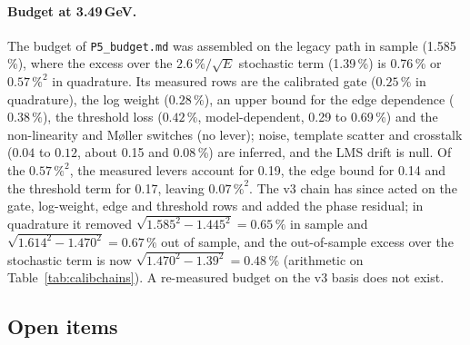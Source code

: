 \documentclass[11pt]{article}
\newcommand{\code}[1]{\texttt{#1}}
\begin{document}
\paragraph{Budget at 3.49\,GeV.} The budget of \code{P5\_budget.md} was assembled on the legacy path in sample (1.585\,\%), where the excess over the $2.6\,\%/\sqrt{E}$ stochastic term (1.39\,\%) is 0.76\,\% or $0.57\,\%^2$ in quadrature. Its measured rows are the calibrated gate ($0.25\,\%$ in quadrature), the log weight ($0.28\,\%$), an upper bound for the edge dependence ($0.38\,\%$), the threshold loss ($0.42\,\%$, model-dependent, 0.29 to 0.69\,\%) and the non-linearity and M{\o}ller switches (no lever); noise, template scatter and crosstalk ($0.04$ to $0.12$, about 0.15 and 0.08\,\%) are inferred, and the LMS drift is null. Of the $0.57\,\%^2$, the measured levers account for 0.19, the edge bound for 0.14 and the threshold term for 0.17, leaving $0.07\,\%^2$. The v3 chain has since acted on the gate, log-weight, edge and threshold rows and added the phase residual; in quadrature it removed $\sqrt{1.585^2 - 1.445^2} = 0.65\,\%$ in sample and $\sqrt{1.614^2 - 1.470^2} = 0.67\,\%$ out of sample, and the out-of-sample excess over the stochastic term is now $\sqrt{1.470^2 - 1.39^2} = 0.48\,\%$ (arithmetic on Table~\ref{tab:calibchains}). A re-measured budget on the v3 basis does not exist.

\subsection{Open items}\label{sec:calibopen}
\end{document}
